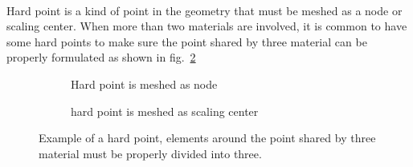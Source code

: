 \paragraph{}
Hard point is a kind of point in the geometry that must be meshed as a node or scaling center.
When more than two materials are involved, it is common to have some hard points to make sure the point shared by three material can be properly formulated as shown in fig.~\ref{qdt_fig:qdt_hard_point_demo}
    \begin{figure}[h!]
        \begin{subfigure}[b]{0.5\linewidth}
            \centering
        \caption{Hard point is meshed as node}
        \end{subfigure}
        \begin{subfigure}[b]{0.5\linewidth}
            \centering
        \caption{hard point is meshed as scaling center}
        \label{qdt_fig:qdt_hard_point_demo_sc}
        \end{subfigure}
        \caption[Example of a hard point]{Example of a hard point, elements around the point shared by three material must be properly divided into three.}
        \label{qdt_fig:qdt_hard_point_demo}
    \end{figure}
